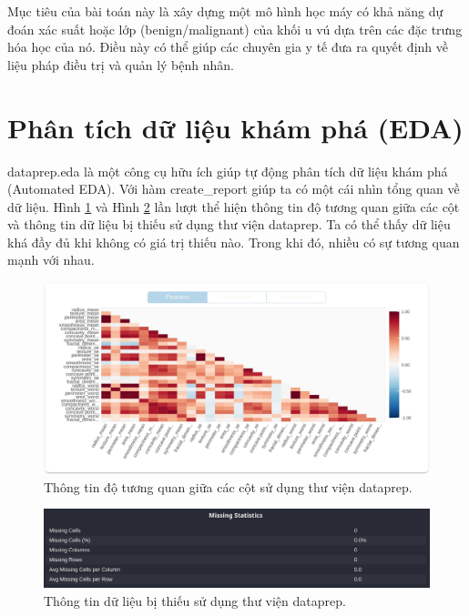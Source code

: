 Mục tiêu của bài toán này là xây dựng một mô hình học máy có khả năng dự đoán xác suất hoặc lớp (benign/malignant) của khối u vú dựa trên các đặc trưng hóa học của nó. Điều này có thể giúp các chuyên gia y tế đưa ra quyết định về liệu pháp điều trị và quản lý bệnh nhân.

\section{Phân tích dữ liệu khám phá (EDA)}
dataprep.eda \cite{dataprepeda2021} là một công cụ hữu ích giúp tự động phân tích dữ liệu khám phá (Automated EDA). Với hàm create\_report giúp ta có một cái nhìn tổng quan về dữ liệu. Hình \ref{fig:correlation} và Hình \ref{fig:missing} lần lượt thể hiện thông tin độ tương quan giữa các cột và thông tin dữ liệu bị thiếu sử dụng thư viện dataprep. Ta có thể thấy dữ liệu khá đầy đủ khi không có giá trị thiếu nào. Trong khi đó, nhiều có sự tương quan mạnh với nhau.

\begin{figure}
    \centering
    \includegraphics[width=\linewidth]{img/correlation.jpeg}
    \caption{Thông tin độ tương quan giữa các cột sử dụng thư viện dataprep.}
    \label{fig:correlation}
\end{figure}
\begin{figure}
    \centering
    \includegraphics[width=\linewidth]{img/missing.jpeg}
    \caption{Thông tin dữ liệu bị thiếu sử dụng thư viện dataprep.}
    \label{fig:missing}
\end{figure}

